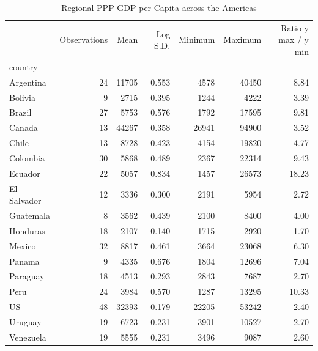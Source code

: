 \begin{table}
\caption{Regional PPP GDP per Capita across the Americas}
\label{tab:regional_gdp}
\begin{tabular}{lrrrrrr}
\toprule
 & Observations & Mean & Log S.D. & Minimum & Maximum & Ratio y max / y min \\
country &  &  &  &  &  &  \\
\midrule
Argentina & 24 & 11705 & 0.553 & 4578 & 40450 & 8.84 \\
Bolivia & 9 & 2715 & 0.395 & 1244 & 4222 & 3.39 \\
Brazil & 27 & 5753 & 0.576 & 1792 & 17595 & 9.81 \\
Canada & 13 & 44267 & 0.358 & 26941 & 94900 & 3.52 \\
Chile & 13 & 8728 & 0.423 & 4154 & 19820 & 4.77 \\
Colombia & 30 & 5868 & 0.489 & 2367 & 22314 & 9.43 \\
Ecuador & 22 & 5057 & 0.834 & 1457 & 26573 & 18.23 \\
El Salvador & 12 & 3336 & 0.300 & 2191 & 5954 & 2.72 \\
Guatemala & 8 & 3562 & 0.439 & 2100 & 8400 & 4.00 \\
Honduras & 18 & 2107 & 0.140 & 1715 & 2920 & 1.70 \\
Mexico & 32 & 8817 & 0.461 & 3664 & 23068 & 6.30 \\
Panama & 9 & 4335 & 0.676 & 1804 & 12696 & 7.04 \\
Paraguay & 18 & 4513 & 0.293 & 2843 & 7687 & 2.70 \\
Peru & 24 & 3984 & 0.570 & 1287 & 13295 & 10.33 \\
US & 48 & 32393 & 0.179 & 22205 & 53242 & 2.40 \\
Uruguay & 19 & 6723 & 0.231 & 3901 & 10527 & 2.70 \\
Venezuela & 19 & 5555 & 0.231 & 3496 & 9087 & 2.60 \\
\bottomrule
\end{tabular}
\end{table}
